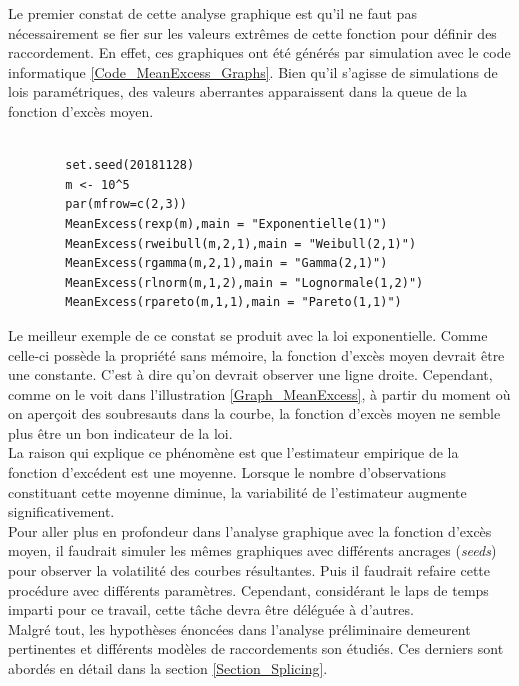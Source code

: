 	Le premier constat de cette analyse graphique est qu'il ne faut pas nécessairement se fier sur les valeurs extrêmes de cette fonction pour définir des raccordement. En effet, ces graphiques ont été générés par simulation avec le code informatique \ref{Code_MeanExcess_Graphs}. Bien qu'il s'agisse de simulations de lois paramétriques, des valeurs aberrantes apparaissent dans la queue de la fonction d'excès moyen. \\
	
	\begin{Code}\label{Code_MeanExcess_Graphs}
		\begin{verbatim}
		
		set.seed(20181128)
		m <- 10^5
		par(mfrow=c(2,3))  
		MeanExcess(rexp(m),main = "Exponentielle(1)")
		MeanExcess(rweibull(m,2,1),main = "Weibull(2,1)")
		MeanExcess(rgamma(m,2,1),main = "Gamma(2,1)") 
		MeanExcess(rlnorm(m,1,2),main = "Lognormale(1,2)")
		MeanExcess(rpareto(m,1,1),main = "Pareto(1,1)")
		\end{verbatim}
	\end{Code}

	Le meilleur exemple de ce constat se produit avec la loi exponentielle. Comme celle-ci possède la propriété sans mémoire, la fonction d'excès moyen devrait être une constante. C'est à dire qu'on devrait observer une ligne droite. Cependant, comme on le voit dans l'illustration \ref{Graph_MeanExcess}, à partir du moment où on aperçoit des soubresauts dans la courbe, la fonction d'excès moyen ne semble plus être un bon indicateur de la loi.\\
	
	La raison qui explique ce phénomène est que l'estimateur empirique de la fonction d'excédent est une moyenne. Lorsque le nombre d'observations constituant cette moyenne diminue, la variabilité de l'estimateur augmente significativement. \\
	
	Pour aller plus en profondeur dans l'analyse graphique avec la fonction d'excès moyen, il faudrait simuler les mêmes graphiques avec différents ancrages (\textit{seeds}) pour observer la volatilité des courbes résultantes. Puis il faudrait refaire cette procédure avec différents paramètres. Cependant, considérant le laps de temps imparti pour ce travail, cette tâche devra être déléguée à d'autres.\\
	
	Malgré tout, les hypothèses énoncées dans l'analyse préliminaire demeurent pertinentes et différents modèles de raccordements son étudiés. Ces derniers sont abordés en détail dans la section \ref{Section_Splicing}.\\
	
